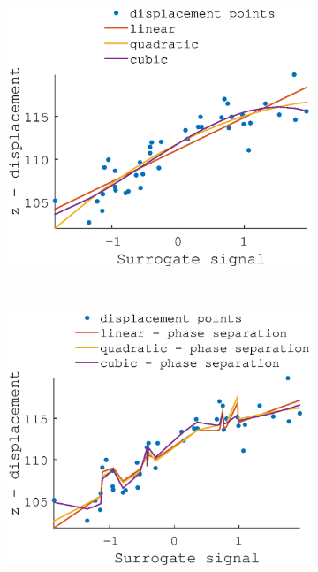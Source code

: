 \documentclass[11pt,a4paper,oneside]{report}
\begin{document}
\begin{figure}[H]
    \hspace*{-2em}
  \begin{subfigure}[b]{0.33\textwidth}
    \includegraphics[width=\textwidth, trim=0 0 0 110,clip=true]{figures/task2/fit_round1_couch3.eps}
  \end{subfigure}%
    ~ %
  \begin{subfigure}[b]{0.33\textwidth}
    \includegraphics[width=\textwidth, trim=0 0 0 110,clip=true]{figures/task2/fit_round2_couch3.eps}

\end{subfigure}
\end{figure}
\end{document}
